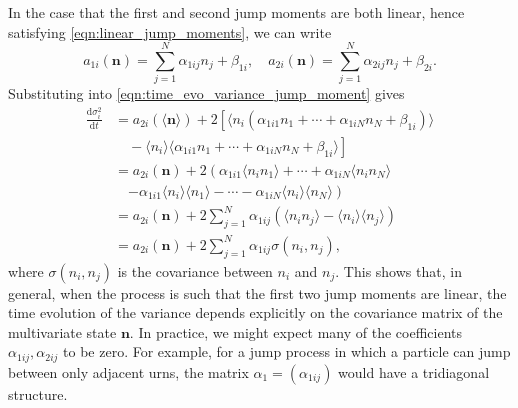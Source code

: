 \documentclass[a4paper,11pt]{report}
\numberwithin{equation}{section}
\newcommand{\diff}[2]{\frac{\mathrm{d} #1}{\mathrm{d} #2}}
\newcommand{\V}[1]{\mathbf{#1}}
\newcommand{\E}[1]{\langle #1 \rangle}
\begin{document}
In the case that the first and second jump moments are both linear, hence
satisfying \eqref{eqn:linear_jump_moments}, we can write
\begin{equation*}
    a_{1i}(\V{n}) = \sum_{j=1}^N \alpha_{1ij} n_j + \beta_{1i}, \quad
    a_{2i}(\V{n}) = \sum_{j=1}^N \alpha_{2ij} n_j + \beta_{2i}.
\end{equation*}
Substituting into \eqref{eqn:time_evo_variance_jump_moment} gives
\begin{equation}
    \begin{aligned}
        \diff{\sigma_i^2}{t} &= a_{2i}(\E{\V{n}}) + 2\left[ \E{n_i (\alpha_{1i1}n_1 +
            \dotsb + \alpha_{1iN}n_N + \beta_{1i})} \right.\\
            &\left. \quad - \E{n_i} \E{ \alpha_{1i1}n_1 +
        \dotsb + \alpha_{1iN}n_N + \beta_{1i}} \right]\\
        &= a_{2i}(\V{n}) + 2\left( \alpha_{1i1}\E{n_i n_1} + \dotsb +
        \alpha_{1iN}\E{n_i n_N}\right.\\
        &\quad \left. - \alpha_{1i1}\E{n_i}\E{n_1} - \dotsb -
        \alpha_{1iN}\E{n_i}\E{n_N} \right)\\
        &= a_{2i}(\V{n}) + 2 \sum_{j=1}^N \alpha_{1ij}(\E{n_i n_j} -
        \E{n_i}\E{n_j})\\
        &= a_{2i}(\V{n}) + 2 \sum_{j=1}^N \alpha_{1ij}\sigma(n_i,n_j),
    \end{aligned}
\end{equation}
where \(\sigma(n_i, n_j)\) is the covariance between \(n_i\) and \(n_j\).
This shows that, in general, when the process is such that the first two jump
moments are linear, the time evolution of the variance depends explicitly on the
covariance matrix of the multivariate state \(\V{n}\). In practice, we might
expect many of the coefficients \(\alpha_{1ij}, \alpha_{2ij}\) to be zero. For
example, for a jump process in which a particle can jump between only adjacent
urns, the matrix \(\alpha_1 = (\alpha_{1ij})\) would have a tridiagonal
structure.
\end{document}
